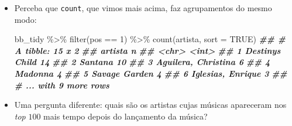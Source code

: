 \documentclass[
  11pt]{report}
\newenvironment{Shaded}{\begin{snugshade}}{\end{snugshade}}
\newcommand{\AttributeTok}[1]{\textcolor[rgb]{0.77,0.63,0.00}{#1}}
\newcommand{\ConstantTok}[1]{\textcolor[rgb]{0.00,0.00,0.00}{#1}}
\newcommand{\DecValTok}[1]{\textcolor[rgb]{0.00,0.00,0.81}{#1}}
\newcommand{\DocumentationTok}[1]{\textcolor[rgb]{0.56,0.35,0.01}{\textbf{\textit{#1}}}}
\newcommand{\FunctionTok}[1]{\textcolor[rgb]{0.00,0.00,0.00}{#1}}
\newcommand{\NormalTok}[1]{#1}
\newcommand{\SpecialCharTok}[1]{\textcolor[rgb]{0.00,0.00,0.00}{#1}}
\renewenvironment{Shaded}{
    \begin{mdframed}[%
      roundcorner=2pt,%
      innerleftmargin=5pt,%
      innerrightmargin=5pt,%
      topline=true,%
      leftline=true,%
      rightline=true,%
      bottomline=true,%
      linewidth=0.5pt,%
      linecolor=black!20,%
      backgroundcolor=black!2,%
      skipabove=2ex,%
      skipbelow=2.5ex%
    ]%
  }
  {
    \end{mdframed}
  }
\begin{document}
\begin{itemize}
\begin{Shaded}
\begin{Highlighting}[]
\NormalTok{bb\_tidy }\SpecialCharTok{\%\textgreater{}\%} 
  \FunctionTok{filter}\NormalTok{(pos }\SpecialCharTok{==} \DecValTok{1}\NormalTok{) }\SpecialCharTok{\%\textgreater{}\%} 
  \FunctionTok{group\_by}\NormalTok{(artista) }\SpecialCharTok{\%\textgreater{}\%}
  \FunctionTok{summarize}\NormalTok{(}\AttributeTok{semanas =} \FunctionTok{n}\NormalTok{()) }\SpecialCharTok{\%\textgreater{}\%} 
  \FunctionTok{arrange}\NormalTok{(}\FunctionTok{desc}\NormalTok{(semanas))}
\DocumentationTok{\#\# \# A tibble: 15 x 2}
\DocumentationTok{\#\#   artista             semanas}
\DocumentationTok{\#\#   \textless{}chr\textgreater{}                 \textless{}int\textgreater{}}
\DocumentationTok{\#\# 1 Destiny\textquotesingle{}s Child          14}
\DocumentationTok{\#\# 2 Santana                  10}
\DocumentationTok{\#\# 3 Aguilera, Christina       6}
\DocumentationTok{\#\# 4 Madonna                   4}
\DocumentationTok{\#\# 5 Savage Garden             4}
\DocumentationTok{\#\# 6 Iglesias, Enrique         3}
\DocumentationTok{\#\# \# ... with 9 more rows}
\end{Highlighting}
\end{Shaded}
\item
  Perceba que \texttt{count}, que vimos mais acima, faz agrupamentos do mesmo modo:

\begin{Shaded}
\begin{Highlighting}[]
\NormalTok{bb\_tidy }\SpecialCharTok{\%\textgreater{}\%} 
  \FunctionTok{filter}\NormalTok{(pos }\SpecialCharTok{==} \DecValTok{1}\NormalTok{) }\SpecialCharTok{\%\textgreater{}\%} 
  \FunctionTok{count}\NormalTok{(artista, }\AttributeTok{sort =} \ConstantTok{TRUE}\NormalTok{)}
\DocumentationTok{\#\# \# A tibble: 15 x 2}
\DocumentationTok{\#\#   artista                 n}
\DocumentationTok{\#\#   \textless{}chr\textgreater{}               \textless{}int\textgreater{}}
\DocumentationTok{\#\# 1 Destiny\textquotesingle{}s Child        14}
\DocumentationTok{\#\# 2 Santana                10}
\DocumentationTok{\#\# 3 Aguilera, Christina     6}
\DocumentationTok{\#\# 4 Madonna                 4}
\DocumentationTok{\#\# 5 Savage Garden           4}
\DocumentationTok{\#\# 6 Iglesias, Enrique       3}
\DocumentationTok{\#\# \# ... with 9 more rows}
\end{Highlighting}
\end{Shaded}
\item
  Uma pergunta diferente: quais são os artistas cujas músicas apareceram nos \emph{top} $100$ mais tempo depois do lançamento da música?


\end{itemize}
\end{document}
